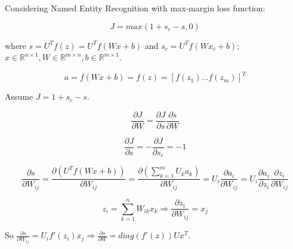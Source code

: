 \documentclass{article}
\begin{document}
Considering Named Entity Recognition with max-margin loss function:

\[J = max(1 + s_c - s, 0)\]

where $s = U^T f(z) = U^T f(Wx + b)$ and $s_c = U^T f(Wx_c + b)$;\\
$x \in \mathbb{R}^{n \times 1}, W \in \mathbb{R}^{m \times n}, b \in \mathbb{R}^{m \times 1}$.

\[a = f(Wx + b) = f(z) = [f(z_1) ... f(z_m)]^T\]

Assume $J = 1 + s_c - s.$

\[\frac{\partial J}{\partial W} = \frac{\partial J}{\partial s} \frac{\partial s}{\partial W}\]

\[\frac{\partial J}{\partial s} = -\frac{\partial J}{\partial s_c} = -1\]

\[\frac{\partial s}{\partial W_{ij}} = \frac{\partial (U^T f(Wx + b))}{\partial W_{ij}} = \frac{\partial(\sum_{k=1}^m U_k a_k)}{\partial W_{ij}} = U_i \frac{\partial a_i}{\partial W_{ij}} = U_i \frac{\partial a_i}{\partial z_i} \frac{\partial z_i}{\partial W_{ij}}\]

\[z_i = \sum_{k=1}^n W_{ik} x_k \Rightarrow \frac{\partial z_i}{\partial W_{ij}} = x_j\]

So $\frac{\partial s}{\partial W_{ij}} = U_i f'(z_i) x_j \Rightarrow \frac{\partial s}{\partial W} = diag(f'(z)) U x^T.$
\end{document}
